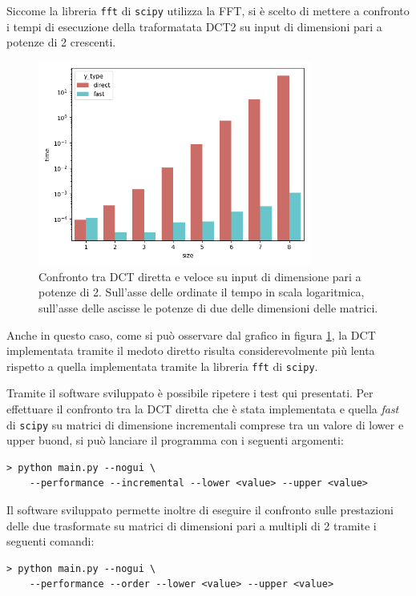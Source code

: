 \documentclass[a4paper, 12pt]{article}
\begin{document}
Siccome la libreria \texttt{fft} di \texttt{scipy} utilizza la FFT, si è scelto
di mettere a confronto i tempi di esecuzione della traformatata DCT2 su input di
dimensioni pari a potenze di 2 crescenti.

\begin{figure}[H]
	\centering
	\includegraphics[width=0.8\textwidth]{../test/benchmark-results/bench-order-0.png}
	\caption{Confronto tra DCT diretta e veloce su input di dimensione pari a
		potenze di 2. Sull'asse delle ordinate il tempo in scala logaritmica,
		sull'asse delle ascisse le potenze di due delle dimensioni delle matrici.}
	\label{fig:order-benchmark}
\end{figure}

Anche in questo caso, come si può osservare dal grafico in figura
\ref{fig:order-benchmark}, la DCT implementata tramite il medoto diretto risulta
considerevolmente più lenta rispetto a quella implementata tramite la libreria
\texttt{fft} di \texttt{scipy}.

Tramite il software sviluppato è possibile ripetere i test qui presentati. Per
effettuare il confronto tra la DCT diretta che è stata implementata e quella
\textit{fast} di \texttt{scipy} su matrici di dimensione incrementali comprese
tra un valore di lower e upper buond, si può lanciare il programma con i
seguenti argomenti:
\vspace{12pt}
\begin{lstlisting}[frame=single]
 > python main.py --nogui \
    --performance --incremental --lower <value> --upper <value>
\end{lstlisting}

Il software sviluppato permette inoltre di eseguire il confronto sulle
prestazioni delle due trasformate su matrici di dimensioni pari a multipli di 2
tramite i seguenti comandi:
\vspace{12pt}
\begin{lstlisting}[frame=single]
 > python main.py --nogui \
    --performance --order --lower <value> --upper <value>
\end{lstlisting}
\end{document}
